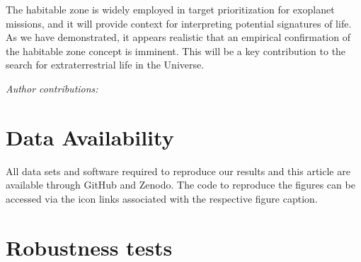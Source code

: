 \documentclass[twocolumn,twocolappendix]{aastex631}
\begin{document}
The habitable zone is widely employed in target prioritization for exoplanet missions, and it will provide context for interpreting potential signatures of life.
As we have demonstrated, it appears realistic that an empirical confirmation of the habitable zone concept is imminent.
This will be a key contribution to the search for extraterrestrial life in the Universe.


\begin{large}\textit{Author contributions:}\end{large}

\section*{Data Availability}
All data sets and software required to reproduce our results and this article are available through GitHub and Zenodo.
The code to reproduce the figures can be accessed via the icon links associated with the respective figure caption.




\appendix
\section{Robustness tests}
\end{document}
